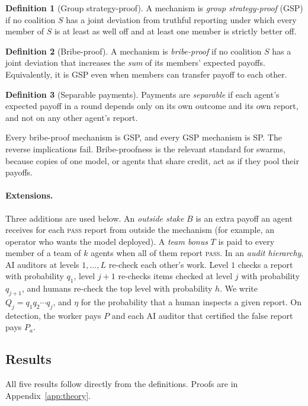 \documentclass[11pt]{article}
\theoremstyle{definition}
\newtheorem{definition}{Definition}
\theoremstyle{remark}
\newcommand{\PASS}{\textnormal{\textsc{pass}}}
\begin{document}
\begin{definition}[Group strategy-proof]
A mechanism is \emph{group strategy-proof} (GSP) if no coalition $S$ has a joint deviation
from truthful reporting under which every member of $S$ is at least as well off and at
least one member is strictly better off.
\end{definition}

\begin{definition}[Bribe-proof]
A mechanism is \emph{bribe-proof} if no coalition $S$ has a joint deviation that increases
the \emph{sum} of its members' expected payoffs. Equivalently, it is GSP even when members
can transfer payoff to each other.
\end{definition}

\begin{definition}[Separable payments]
Payments are \emph{separable} if each agent's expected payoff in a round depends only on its
own outcome and its own report, and not on any other agent's report.
\end{definition}

Every bribe-proof mechanism is GSP, and every GSP mechanism is SP. The reverse
implications fail. Bribe-proofness is the relevant standard for swarms, because copies of
one model, or agents that share credit, act as if they pool their payoffs.

\paragraph{Extensions.} Three additions are used below. An \emph{outside stake} $B$ is an
extra payoff an agent receives for each \PASS{} report from outside the mechanism (for
example, an operator who wants the model deployed). A \emph{team bonus} $T$ is paid to every
member of a team of $k$ agents when all of them report \PASS{}. In an \emph{audit
hierarchy}, AI auditors at levels $1,\dots,L$ re-check each other's work. Level $1$
checks a report with probability $q_1$, level $j+1$ re-checks items checked at level $j$
with probability $q_{j+1}$, and humans re-check the top level with probability $h$. We
write $Q_j=q_1q_2\cdots q_j$, and $\eta$ for the probability that a human inspects a given
report. On detection, the worker pays $P$ and each AI auditor that certified the false
report pays $P_a$.

\subsection{Results}
All five results follow directly from the definitions. Proofs are in
Appendix~\ref{app:theory}.
\end{document}
